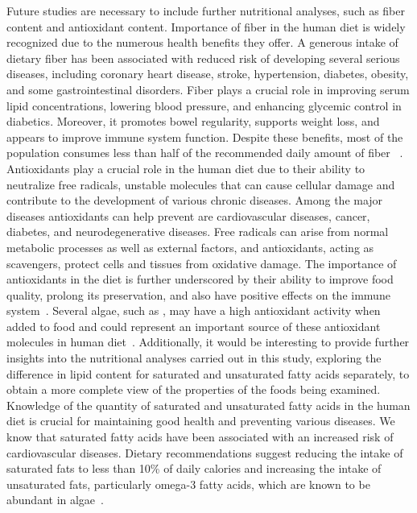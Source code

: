 Future studies are necessary to include further nutritional analyses, such as fiber content and antioxidant content. Importance of fiber in the human diet is widely recognized due to the numerous health benefits they offer. A generous intake of dietary fiber has been associated with reduced risk of developing several serious diseases, including coronary heart disease, stroke, hypertension, diabetes, obesity, and some gastrointestinal disorders. Fiber plays a crucial role in improving serum lipid concentrations, lowering blood pressure, and enhancing glycemic control in diabetics. Moreover, it promotes bowel regularity, supports weight loss, and appears to improve immune system function. Despite these benefits, most of the population consumes less than half of the recommended daily amount of fiber ~\parencite{anderson_Health_2009}. Antioxidants play a crucial role in the human diet due to their ability to neutralize free radicals, unstable molecules that can cause cellular damage and contribute to the development of various chronic diseases. Among the major diseases antioxidants can help prevent are cardiovascular diseases, cancer, diabetes, and neurodegenerative diseases. Free radicals can arise from normal metabolic processes as well as external factors, and antioxidants, acting as scavengers, protect cells and tissues from oxidative damage. The importance of antioxidants in the diet is further underscored by their ability to improve food quality, prolong its preservation, and also have positive effects on the immune system~\parencite{zehiroglu_importance_2019}. Several algae, such as , may have a high antioxidant activity when added to food and could represent an important source of these antioxidant molecules in human diet~\parencite{stunda-zujeva_Comparison_2023}. Additionally, it would be interesting to provide further insights into the nutritional analyses carried out in this study, exploring the difference in lipid content for saturated and unsaturated fatty acids separately, to obtain a more complete view of the properties of the foods being examined. Knowledge of the quantity of saturated and unsaturated fatty acids in the human diet is crucial for maintaining good health and preventing various diseases. We know that saturated fatty acids have been associated with an increased risk of cardiovascular diseases. Dietary recommendations suggest reducing the intake of saturated fats to less than 10\% of daily calories and increasing the intake of unsaturated fats, particularly omega-3 fatty acids, which are known to be abundant in algae~\parencite{lunn_health_2006}. 
